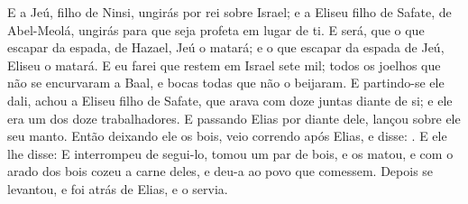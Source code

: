 {{  E a Jeú, filho de Ninsi, ungirás por rei sobre Israel; e a Eliseu filho de Safate, de Abel-Meolá, ungirás para que seja profeta em lugar de ti.
  E será, que o que escapar da espada, de Hazael, Jeú o matará; e o que escapar da espada de Jeú, Eliseu o matará.
  E eu farei que restem em Israel sete mil; todos os joelhos que não se encurvaram a Baal, e bocas todas que não o beijaram}.
  E partindo-se ele dali, achou a Eliseu filho de Safate, que arava com doze juntas diante de si; e ele era um dos doze trabalhadores. E passando Elias por diante dele, lançou sobre ele seu manto.
  Então deixando ele os bois, veio correndo após Elias, e disse: . E ele lhe disse: 
  E interrompeu de segui-lo, tomou um par de bois, e os matou, e com o arado dos bois cozeu a carne deles, e deu-a ao povo que comessem. Depois se levantou, e foi atrás de Elias, e o servia.
\par }

